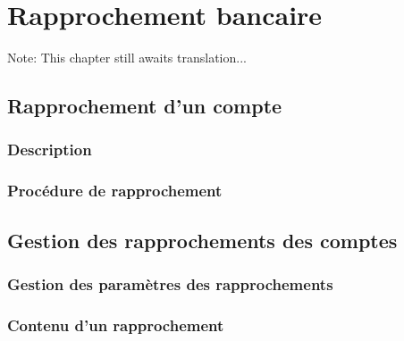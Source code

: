 
\chapter{Rapprochement bancaire\label{reconciliation}}

Note: This chapter still awaits translation...

\section{Rapprochement d'un compte\label{reconciliation-account}}

\subsection{Description\label{reconciliation-account-description}}

\subsection{Procédure de rapprochement\label{reconciliation-account-howto} }


\section{Gestion des rapprochements des comptes\label{reconciliation-manage}}


\subsection{Gestion des paramètres des rapprochements\label{reconciliation-manage-parameters}}

\subsection{Contenu d'un rapprochement\label{reconciliation-manage-content}}

